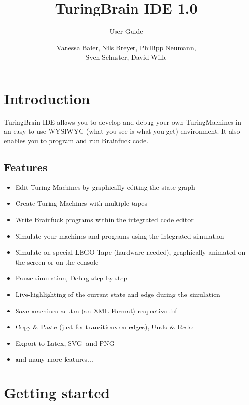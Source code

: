 \documentclass[%
  a4paper,%
  11pt,%
  blue,%
  hyperref	%
  ]{tubsartcl}
\title{TuringBrain IDE \LARGE 1.0}
\subtitle{User Guide}
\author{\small Vanessa Baier, Nils Breyer, Phillipp Neumann,\\ Sven Schuster, David Wille}
\begin{document}
\maketitle[image,logo=right]%

\tableofcontents
\newpage
\section{Introduction}

TuringBrain IDE allows you to develop and debug your own TuringMachines in an easy to use WYSIWYG (what you see is what you get) environment. It also enables you to program and run Brainfuck code.

\subsection{Features}

\begin{itemize}
  \item Edit Turing Machines by graphically editing the state graph
  \item Create Turing Machines with multiple tapes
  \item Write Brainfuck programs within the integrated code editor
  \item Simulate your machines and programs using the integrated simulation
  \item Simulate on special LEGO-Tape (hardware needed), graphically animated on the screen or on the console
  \item Pause simulation, Debug step-by-step
  \item Live-highlighting of the current state and edge during the simulation
  \item Save machines as .tm (an XML-Format) respective .bf
  \item Copy \& Paste (just for transitions on edges), Undo \& Redo
  \item Export to Latex, SVG, and PNG
  \item and many more features...
\end{itemize}

\section{Getting started}
\end{document}
